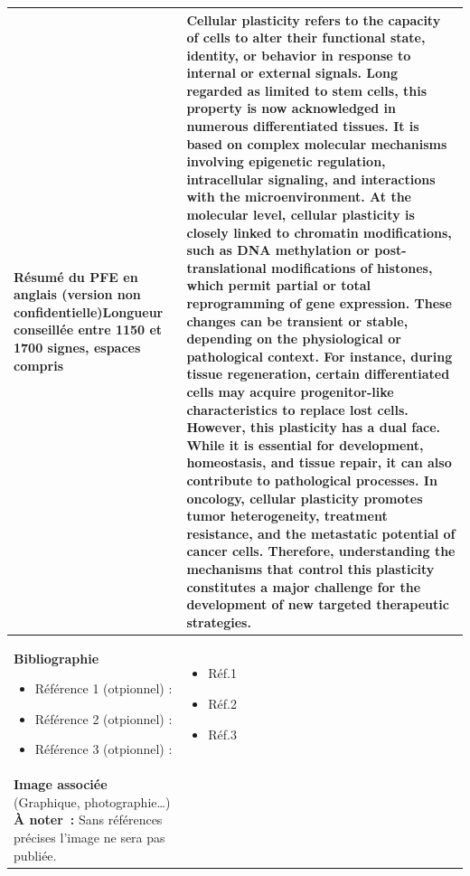 \documentclass[12pt,a4paper]{article}
\begin{document}
\begin{longtable}{|p{7cm}|p{9cm}|}
    \textbf{Résumé du PFE en anglais (version non confidentielle)}\newline\newline Longueur conseillée entre 1150 et 1700 signes, espaces compris & Cellular plasticity refers to the capacity of cells to alter their functional state, identity, or behavior in response to internal or external signals. Long regarded as limited to stem cells, this property is now acknowledged in numerous differentiated tissues. It is based on complex molecular mechanisms involving epigenetic regulation, intracellular signaling, and interactions with the microenvironment. At the molecular level, cellular plasticity is closely linked to chromatin modifications, such as DNA methylation or post-translational modifications of histones, which permit partial or total reprogramming of gene expression. These changes can be transient or stable, depending on the physiological or pathological context. For instance, during tissue regeneration, certain differentiated cells may acquire progenitor-like characteristics to replace lost cells. However, this plasticity has a dual face. While it is essential for development, homeostasis, and tissue repair, it can also contribute to pathological processes. In oncology, cellular plasticity promotes tumor heterogeneity, treatment resistance, and the metastatic potential of cancer cells. Therefore, understanding the mechanisms that control this plasticity constitutes a major challenge for the development of new targeted therapeutic strategies. \\ \hline
    \textbf{Bibliographie}\newline\begin{itemize} \item Référence 1 (otpionnel) : \item Référence 2 (otpionnel) : \item Référence 3 (otpionnel) : \end{itemize} &\begin{itemize} \item Réf.1  \item Réf.2  \item Réf.3 \end{itemize}  \\ \hline
    \textbf{Image associée} \newline\newline
    (Graphique, photographie…)\newline\newline
    \textbf{À noter :} Sans références précises l’image ne sera pas publiée.\newline\newline

\end{longtable}
\end{document}
